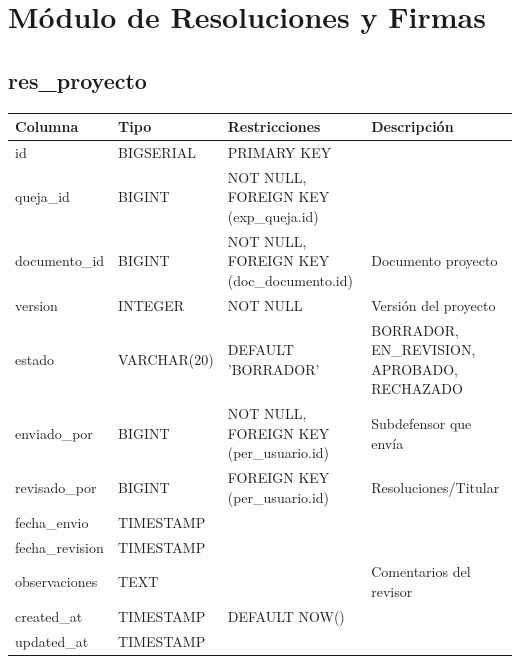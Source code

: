 \documentclass[12pt, a4paper]{article}
\begin{document}
\section{Módulo de Resoluciones y Firmas}
\label{sec:resoluciones}

\subsection{res\_proyecto}
\begin{longtable}{|p{3.5cm}|p{2.5cm}|p{3cm}|p{5cm}|}
    \hline
    \rowcolor[gray]{0.9}
    \textbf{Columna} & \textbf{Tipo} & \textbf{Restricciones} & \textbf{Descripción} \\
    \hline
    id & BIGSERIAL & PRIMARY KEY & \\
    \hline
    queja\_id & BIGINT & NOT NULL, FOREIGN KEY (exp\_queja.id) & \\
    \hline
    documento\_id & BIGINT & NOT NULL, FOREIGN KEY (doc\_documento.id) & Documento proyecto \\
    \hline
    version & INTEGER & NOT NULL & Versión del proyecto \\
    \hline
    estado & VARCHAR(20) & DEFAULT 'BORRADOR' & BORRADOR, EN\_REVISION, APROBADO, RECHAZADO \\
    \hline
    enviado\_por & BIGINT & NOT NULL, FOREIGN KEY (per\_usuario.id) & Subdefensor que envía \\
    \hline
    revisado\_por & BIGINT & FOREIGN KEY (per\_usuario.id) & Resoluciones/Titular \\
    \hline
    fecha\_envio & TIMESTAMP & & \\
    \hline
    fecha\_revision & TIMESTAMP & & \\
    \hline
    observaciones & TEXT & & Comentarios del revisor \\
    \hline
    created\_at & TIMESTAMP & DEFAULT NOW() & \\
    \hline
    updated\_at & TIMESTAMP & & \\
    \hline
\end{longtable}
\end{document}
